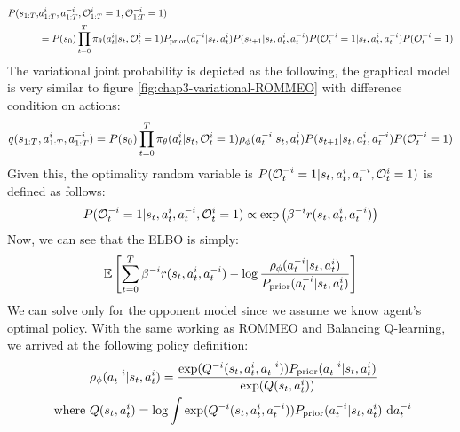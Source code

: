 \begin{equation}
\begin{aligned}
    P(s_{1:T}, &a^i_{1:T}, a^{-i}_{1:T}, \mathcal{O}^i_{1:T} = 1, \mathcal{O}^{-i}_{1:T} = 1) \\
    &= P(s_0) \prod^T_{t=0} \pi_\theta(a^i_t | s_t, \mathcal{O}^{i}_{t} = 1) P_{\text{prior}}(a^{-i}_t | s_t, a^i_t) P(s_{t+1} | s_t, a^i_t, a^{-i}_t) P(\mathcal{O}^{-i}_t = 1 | s_t, a^i_t, a^{-i}_t) P(\mathcal{O}^{-i}_t = 1)
\end{aligned}
\end{equation}
The variational joint probability is depicted as the following, the graphical model is very similar to figure \ref{fig:chap3-variational-ROMMEO} with difference condition on actions: 
\begin{equation}
    q(s_{1:T}, a_{1:T}^i, a^{-i}_{1:T}) = P(s_0) \prod^T_{t=0} \pi_\theta(a^i_t | s_t, \mathcal{O}^{i}_{t} = 1) \rho_{\phi}(a^{-i}_t | s_t, a^i_t) P(s_{t+1} | s_t, a^i_t, a^{-i}_t)P(\mathcal{O}^{-i}_t = 1)
\end{equation}
Given this, the optimality random variable is $P(\mathcal{O}_t^{-i} = 1 | s_t, a^i_t, a^{-i}_t, \mathcal{O}^{i}_t = 1)$ is defined as follows:
\begin{equation}
P(\mathcal{O}_t^{-i} = 1 | s_t, a^i_t, a^{-i}_t, \mathcal{O}^{i}_t = 1) \propto \exp \left(  \beta^{-i} r(s_t, a^i_t, a^{-i}_t)   \right)
\end{equation}
Now, we can see that the ELBO is simply:
\begin{equation}
    \mathbb{E}\left[ \sum^T_{t=0} \beta^{-i} r(s_t, a^i_t, a^{-i}_t) - \log \frac{\rho_{\phi}(a^{-i}_t | s_t, a^i_t)}{ P_{\text{prior}}(a^{-i}_t | s_t, a^i_t)} \right]
\end{equation}
We can solve only for the opponent model since we assume we know agent's optimal policy. With the same working as ROMMEO and Balancing Q-learning, we arrived at the following policy definition:
\begin{equation}
\begin{aligned}
\label{eqn:chap3-prob-opponent}
    &\rho_{\phi}(a^{-i}_t | s_t, a^i_t) = \frac{\exp(Q^{-i}(s_t, a^i_t, a^{-i}_t))P_{\text{prior}}(a^{-i}_t | s_t, a^i_t)}{\exp(Q(s_t, a^{i}_t))} \\
    \text{ where }&Q(s_t, a^{i}_t) = \log \int \exp(Q^{-i}(s_t, a^i_t, a^{-i}_t))P_{\text{prior}}(a^{-i}_t | s_t, a^i_t) \ \mathrm{d} a^{-i}_t \\
\end{aligned}
\end{equation}
